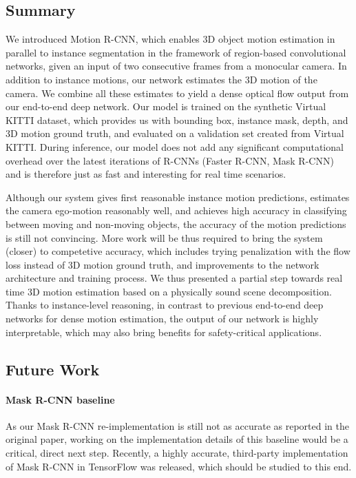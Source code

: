 \subsection{Summary}

We introduced Motion R-CNN, which enables 3D object motion estimation in parallel
to instance segmentation in the framework of region-based convolutional networks,
given an input of two consecutive frames from a monocular camera.
In addition to instance motions, our network estimates the 3D motion of the camera.
We combine all these estimates to yield a dense optical flow output from our
end-to-end deep network.
Our model is trained on the synthetic Virtual KITTI dataset, which provides
us with bounding box, instance mask, depth, and 3D motion ground truth,
and evaluated on a validation set created from Virtual KITTI.
During inference, our model does not add any significant computational overhead
over the latest iterations of R-CNNs (Faster R-CNN, Mask R-CNN) and is therefore just as fast and interesting
for real time scenarios.

Although our system gives first reasonable instance motion predictions,
estimates the camera ego-motion reasonably well,
and achieves high accuracy in classifying between moving and non-moving objects,
the accuracy of the motion predictions is still not convincing.
More work will be thus required to bring the system (closer) to competetive accuracy,
which includes trying penalization with the flow loss instead of 3D motion ground truth,
and improvements to the network architecture and training process.
We thus presented a partial step towards real time 3D motion estimation based on a
physically sound scene decomposition. Thanks to instance-level reasoning, in contrast
to previous end-to-end deep networks for dense motion estimation, the output
of our network is highly interpretable, which may also bring benefits for safety-critical
applications.

\subsection{Future Work}
\paragraph{Mask R-CNN baseline}
As our Mask R-CNN re-implementation is still not as accurate as reported in the
original paper, working on the implementation details of this baseline would be
a critical, direct next step. Recently, a highly accurate, third-party implementation of Mask
R-CNN in TensorFlow was released, which should be studied to this end.

